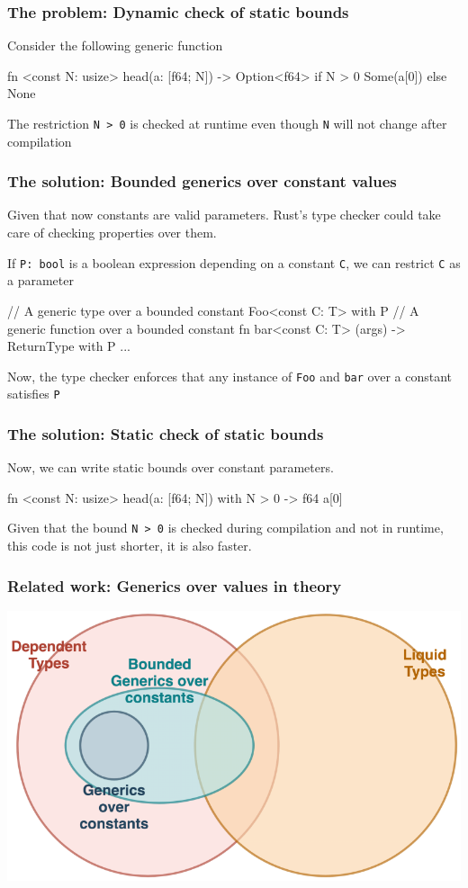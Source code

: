 \documentclass{beamer}
\newcommand{\code}[1] {\texttt{\footnotesize #1}}
\begin{document}
\begin{frame}[fragile]
    \frametitle{The problem: Dynamic check of static bounds}
    Consider the following generic function
    \begin{rustcode}
        fn <const N: usize> head(a: [f64; N]) -> Option<f64> {
            if N > 0 {
                Some(a[0])
            } else {
                None
            }
        }
    \end{rustcode}
    The restriction \code{N > 0} is checked at runtime even though \code{N} will not change after compilation
\end{frame}

\begin{frame}[fragile]
    \frametitle{The solution: Bounded generics over constant values}
    Given that now constants are valid parameters. Rust's type checker could take care of checking properties over them.

    If \code{P: bool} is a boolean expression depending on a constant \code{C}, we can restrict \code{C} as a parameter
    \begin{rustcode}
        // A generic type over a bounded constant
        Foo<const C: T> with P
        // A generic function over a bounded constant
        fn bar<const C: T> (args) -> ReturnType with P { ... }
    \end{rustcode}

    Now, the type checker enforces that any instance of \code{Foo} and \code{bar} over a constant satisfies \code{P}
    
\end{frame}

\begin{frame}[fragile]
    \frametitle{The solution: Static check of static bounds}
    Now, we can write static bounds over constant parameters.
    \begin{rustcode}
        fn <const N: usize> head(a: [f64; N]) with {N > 0} -> f64 {
            a[0]
        }
    \end{rustcode}
    Given that the bound \code{N > 0} is checked during compilation and not in runtime, this code is not just shorter, it is also faster.
\end{frame}

\begin{frame}[fragile]
    \frametitle{Related work: Generics over values in theory}
    \includegraphics[width=\textwidth]{./theory.png}
\end{frame}
\end{document}
